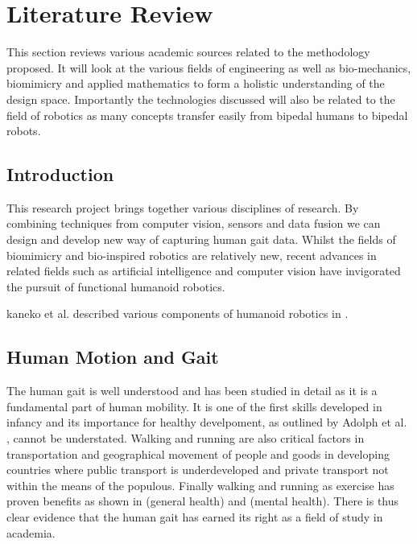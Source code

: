 \chapter{Literature Review}
This section reviews various academic sources related to the methodology proposed. It will look at the various fields of engineering as well as bio-mechanics, biomimicry and applied mathematics to form a holistic understanding of the design space. Importantly the technologies discussed will also be related to the field of robotics as many concepts transfer easily from bipedal humans to bipedal robots. 



\section{Introduction}
This research project brings together various disciplines of research. By combining techniques from computer vision, sensors and data fusion we can design and develop new way of capturing human gait data. Whilst the fields of biomimicry and bio-inspired robotics are relatively new, recent advances in related fields such as artificial intelligence and computer vision have invigorated the pursuit of functional humanoid robotics. 

kaneko et al. described various components of humanoid robotics in \cite{kaneko2002design}. 






\section{Human Motion and Gait}
The human gait is well understood and has been studied in detail as it is a fundamental part of human mobility. It is one of the first skills developed in infancy and its importance for healthy develpoment, as outlined by Adolph et al. \cite{adolph2013road}, cannot be understated. Walking and running are also critical factors in transportation and geographical movement of people and goods in developing countries where public transport is underdeveloped and private transport not within the means of the populous. Finally walking and running as exercise has proven benefits as shown in \cite{hanson2015there} (general health) and \cite{fox1999influence} (mental health). There is thus clear evidence that the human gait has earned its right as a field of study in academia.



